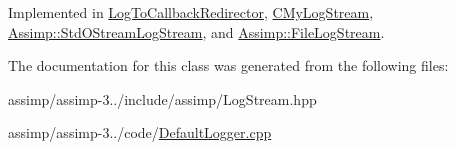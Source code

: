 Implemented in \hyperlink{class_log_to_callback_redirector_a67822e72cc04381bb7b591405478fa96}{Log\+To\+Callback\+Redirector}, \hyperlink{class_c_my_log_stream_a62f392bab1c11ccb46d12fc3c7b74b8e}{C\+My\+Log\+Stream}, \hyperlink{class_assimp_1_1_std_o_stream_log_stream_a0262ea5e4213b1e126934b367680f95e}{Assimp\+::\+Std\+O\+Stream\+Log\+Stream}, and \hyperlink{class_assimp_1_1_file_log_stream_abeadc880a20fa886ac65608a8296ba29}{Assimp\+::\+File\+Log\+Stream}.



The documentation for this class was generated from the following files\+:\begin{DoxyCompactItemize}
\item 
assimp/assimp-\/3../include/assimp/Log\+Stream.\+hpp\item 
assimp/assimp-\/3../code/\hyperlink{_default_logger_8cpp}{Default\+Logger.\+cpp}\end{DoxyCompactItemize}
